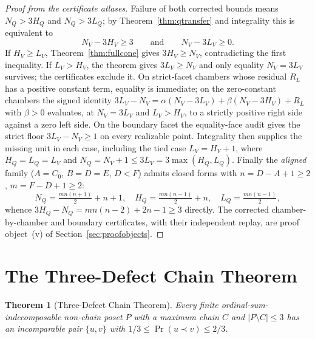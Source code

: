 \documentclass[11pt]{article}
\newtheorem{theorem}{Theorem}[section]
\theoremstyle{definition}
\theoremstyle{remark}
\newcommand{\pr}{\operatorname{Pr}}
\begin{document}
\begin{proof}[Proof from the certificate atlases]
Failure of both corrected bounds means $N_Q>3H_Q$ and $N_Q>3L_Q$; by
Theorem~\ref{thm:qtransfer} and integrality this is equivalent to
\[
N_V-3H_V\ge3\qquad\text{and}\qquad N_V-3L_V\ge0 .
\]
If $H_V\ge L_V$, Theorem~\ref{thm:fullcone} gives $3H_V\ge N_V$, contradicting the first
inequality. If $L_V>H_V$, the theorem gives $3L_V\ge N_V$ and only equality
$N_V=3L_V$ survives; the certificates exclude it. On strict-facet chambers whose residual
$R_L$ has a positive constant term, equality is immediate; on the zero-constant chambers
the signed identity $3L_V-N_V=\alpha(N_V-3L_V)+\beta(N_V-3H_V)+R_L$ with $\beta>0$
evaluates, at $N_V=3L_V$ and $L_V>H_V$, to a strictly positive right side against a zero
left side. On the boundary facet the equality-face audit gives the strict floor
$3L_V-N_V\ge1$ on every realizable point. Integrality then supplies the missing unit in
each case, including the tied case $L_V=H_V+1$, where $H_Q=L_Q=L_V$ and
$N_Q=N_V+1\le3L_V=3\max(H_Q,L_Q)$. Finally the \emph{aligned} family
($A=C_0$, $B=D=E$, $D<F$) admits closed forms with $n=D-A+1\ge2$, $m=F-D+1\ge2$:
\[
N_Q=\tfrac{mn(n+1)}2+n+1,\quad H_Q=\tfrac{mn(n-1)}2+n,\quad L_Q=\tfrac{mn(n-1)}2,
\]
whence $3H_Q-N_Q=mn(n-2)+2n-1\ge3$ directly. The corrected chamber-by-chamber and
boundary certificates, with their independent replay, are proof object~(v) of
Section~\ref{sec:proofobjects}.
\end{proof}

\section{The Three-Defect Chain Theorem}\label{sec:assembly}
\begin{theorem}[Three-Defect Chain Theorem]\label{thm:threedefect}
Every finite ordinal-sum-indecomposable non-chain poset $P$ with a maximum chain $C$ and
$|P\setminus C|\le3$ has an incomparable pair $\{u,v\}$ with $1/3\le\pr(u\prec v)\le2/3$.
\end{theorem}
\end{document}
